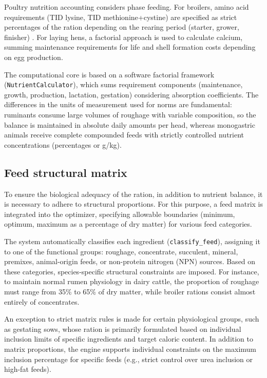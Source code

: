 \documentclass[a4paper,fleqn]{cas-sc}
\begin{document}
Poultry nutrition accounting considers phase feeding. For broilers, amino acid requirements (TID lysine, TID methionine+cystine) are specified as strict percentages of the ration depending on the rearing period (starter, grower, finisher) \citep{vnitip2017, nRC1994}. For laying hens, a factorial approach is used to calculate calcium, summing maintenance requirements for life and shell formation costs depending on egg production.

The computational core is based on a software factorial framework (\texttt{NutrientCalculator}), which sums requirement components (maintenance, growth, production, lactation, gestation) considering absorption coefficients. The differences in the units of measurement used for norms are fundamental: ruminants consume large volumes of roughage with variable composition, so the balance is maintained in absolute daily amounts per head, whereas monogastric animals receive complete compounded feeds with strictly controlled nutrient concentrations (percentages or g/kg).

\subsection{Feed structural matrix}\label{subsec:matrix}

To ensure the biological adequacy of the ration, in addition to nutrient balance, it is necessary to adhere to structural proportions. For this purpose, a feed matrix is integrated into the optimizer, specifying allowable boundaries (minimum, optimum, maximum as a percentage of dry matter) for various feed categories.

The system automatically classifies each ingredient (\texttt{classify\_feed}), assigning it to one of the functional groups: roughage, concentrate, succulent, mineral, premixes, animal-origin feeds, or non-protein nitrogen (NPN) sources. Based on these categories, species-specific structural constraints are imposed. For instance, to maintain normal rumen physiology in dairy cattle, the proportion of roughage must range from 35\% to 65\% of dry matter, while broiler rations consist almost entirely of concentrates.

An exception to strict matrix rules is made for certain physiological groups, such as gestating sows, whose ration is primarily formulated based on individual inclusion limits of specific ingredients and target caloric content. In addition to matrix proportions, the engine supports individual constraints on the maximum inclusion percentage for specific feeds (e.g., strict control over urea inclusion or high-fat feeds).
\end{document}
